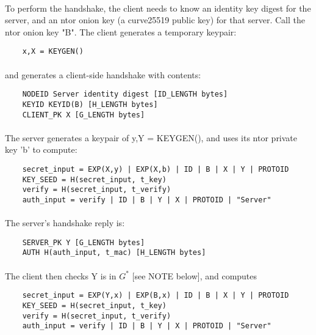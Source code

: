 \paragraph{}
To perform the handshake, the client needs to know an identity key
digest for the server, and an ntor onion key (a curve25519 public
key) for that server. Call the ntor onion key "B". The client
generates a temporary keypair:

\begin{verbatim}
    x,X = KEYGEN()
\end{verbatim}

\paragraph{}
and generates a client-side handshake with contents:
\begin{verbatim}
    NODEID Server identity digest [ID_LENGTH bytes]
    KEYID KEYID(B) [H_LENGTH bytes]
    CLIENT_PK X [G_LENGTH bytes]
\end{verbatim}

\paragraph{}
The server generates a keypair of y,Y = KEYGEN(), and uses its ntor
private key 'b' to compute:

\begin{verbatim}
    secret_input = EXP(X,y) | EXP(X,b) | ID | B | X | Y | PROTOID
    KEY_SEED = H(secret_input, t_key)
    verify = H(secret_input, t_verify)
    auth_input = verify | ID | B | Y | X | PROTOID | "Server"
\end{verbatim}

\paragraph{}
The server's handshake reply is:

\begin{verbatim}
    SERVER_PK Y [G_LENGTH bytes]
    AUTH H(auth_input, t_mac) [H_LENGTH bytes]
\end{verbatim}

\paragraph{}
The client then checks Y is in $G^*$ [see NOTE below], and computes

\begin{verbatim}
    secret_input = EXP(Y,x) | EXP(B,x) | ID | B | X | Y | PROTOID
    KEY_SEED = H(secret_input, t_key)
    verify = H(secret_input, t_verify)
    auth_input = verify | ID | B | Y | X | PROTOID | "Server"
\end{verbatim}

